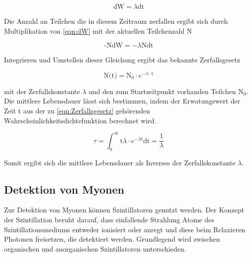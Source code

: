         \begin{equation}
            \text{dW} = \lambda \text{dt}
            \label{eqn:dW}
        \end{equation}

        Die Anzahl an Teilchen die in diesem Zeitraum zerfallen ergibt sich durch Multiplikation von \eqref{eqn:dW} mit der aktuellen Teilchenzahl N

        \begin{equation*}
            \text{-NdW} = -\lambda \text{Ndt}
        \end{equation*}

        Integrieren und Umstellen dieser Gleichung ergibt das bekannte Zerfallsgesetz
        
        \begin{equation}
            \text{N(t)} = \text{N}_0 \cdot e^{- \lambda \cdot \text{t}}
            \label{eqn:Zerfallsgesetz}
        \end{equation}

        mit der Zerfallskonstante $\lambda$ und den zum Startzeitpunkt vorhanden Teilchen $\text{N}_0$. Die mittlere Lebensdauer lässt sich bestimmen, indem der Erwatungswert der Zeit t aus der zu 
        \eqref{eqn:Zerfallsgesetz} gehörenden Wahrscheinlichkeitsdichtefunktion berechnet wird.

        \begin{equation}
            \tau = \int_0^{\infty} \text{t} \lambda \cdot e^{-\lambda \text{t}} \text{dt} = \frac{1}{\lambda}
            \label{eqn:mittlere_Lebensdauer}
        \end{equation}

        Somit ergibt sich die mittlere Lebensdauer als Inverses der Zerfallskonstante $\lambda$.

    \subsection{Detektion von Myonen}
        Zur Detektion von Myonen können Szintillatoren genutzt werden. Der Konzept der Szintillation beruht darauf, dass einfallende Strahlung Atome des Szintillationsmediums entweder ionisiert oder anregt und 
        diese beim Relaxieren Photonen freisetzen, die detektiert werden. Grundlegend wird zwischen organischen und anorganischen Szintillatoren unterschieden.

